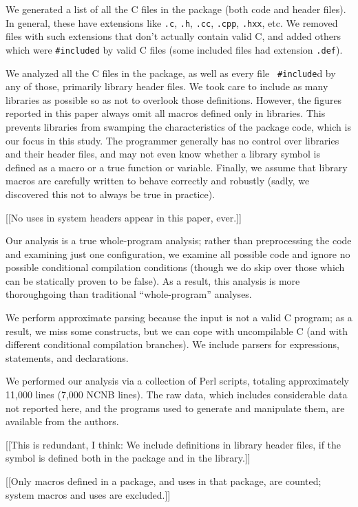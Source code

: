 \documentclass[10pt]{article}
\newcommand{\file}[1]{\texttt{#1}}
\begin{document}
We generated a list of all the C files in the package (both code and header
files).  In general, these have extensions like \file{.c}, \file{.h},
\file{.cc}, \file{.cpp}, \file{.hxx}, etc.  We removed files with such
extensions that don't actually contain valid C, and added others which were
{\tt \#included} by valid C files (some included files had extension
\file{.def}).

We analyzed all the C files in the package, as well as every file {\tt
\#include}d by any of those, primarily library header files.  We
took care to include as many libraries as possible so as not to overlook
those definitions.  However, the figures reported in this paper always omit
all macros defined only in libraries.  This prevents libraries from
swamping the characteristics of the package code, which is our focus in
this study.  The programmer generally has no control over libraries and
their header files, and may not even know whether a library symbol is
defined as a macro or a true function or variable.  Finally, we assume that
library macros are carefully written to behave correctly and robustly
(sadly, we discovered this not to always be true in practice).

[[No uses in system headers appear in this paper, ever.]]

Our analysis is a true whole-program analysis; rather than preprocessing the
code and examining just one configuration, we examine all possible code and
ignore no possible  conditional compilation conditions (though we do skip
over those which can be statically proven to be false).   As a result, this
analysis is more thoroughgoing than traditional ``whole-program'' analyses.

We perform approximate parsing because the input is not a valid C program;
as a result, we miss some constructs, but we can cope with uncompilable C
(and with different conditional compilation branches).  We include parsers
for expressions, statements, and declarations.

We performed our analysis via a collection of Perl scripts, totaling
approximately 11,000 lines (7,000 NCNB lines).  The raw data, which
includes considerable data not reported here, and the programs used to
generate and manipulate them, are available from the authors.


[[This is redundant, I think: We include definitions in library header
files, if the symbol is defined both in the package and in the library.]]

[[Only macros defined
in a package, and uses in that package, are counted; system macros and uses
are excluded.]]
\end{document}
